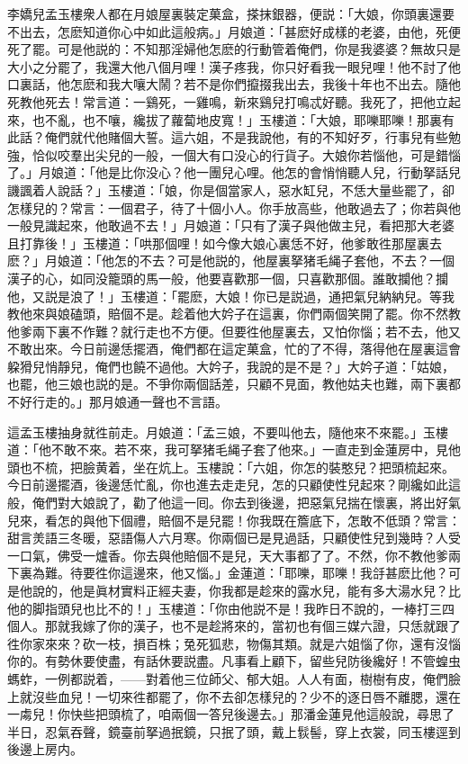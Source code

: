 李嬌兒孟玉樓衆人都在月娘屋裏裝定菓盒，搽抹銀器，便説：「大娘，你頭裏還要不出去，怎麽知道你心中如此這般病。」月娘道：「甚麽好成樣的老婆，由他，死便死了罷。可是他説的：不知那淫婦他怎麽的行動管着俺們，你是我婆婆？無故只是大小之分罷了，我還大他八個月哩！漢子疼我，你只好看我一眼兒哩！他不討了他口裏話，他怎麽和我大嚷大鬧？若不是你們攛掇我出去，我後十年也不出去。隨他死教他死去！常言道：一鷄死，一雞鳴，新來鷄兒打鳴忒好聽。我死了，把他立起來，也不亂，也不嚷，纔拔了蘿蔔地皮寬！」玉樓道：「大娘，耶嚛耶嚛！那裏有此話？俺們就代他賭個大誓。這六姐，不是我說他，有的不知好歹，行事兒有些勉強，恰似咬羣出尖兒的一般，一個大有口没心的行貨子。大娘你若惱他，可是錯惱了。」月娘道：「他是比你没心？他一團兒心哩。他怎的會悄悄聽人兒，行動拏話兒譏諷着人說話？」玉樓道：「娘，你是個當家人，惡水缸兒，不恁大量些罷了，卻怎樣兒的？常言：一個君子，待了十個小人。你手放高些，他敢過去了；你若與他一般見識起來，他敢過不去！」月娘道：「只有了漢子與他做主兒，看把那大老婆且打靠後！」玉樓道：「哄那個哩！如今像大娘心裏恁不好，他爹敢徃那屋裏去麽？」月娘道：「他怎的不去？可是他説的，他屋裏拏猪毛䋲子套他，不去？一個漢子的心，如同没籠頭的馬一般，他要喜歡那一個，只喜歡那個。誰敢攔他？攔他，又説是浪了！」玉樓道：「罷麽，大娘！你已是説過，通把氣兒納納兒。等我教他來與娘磕頭，賠個不是。趁着他大妗子在這裏，你們兩個笑開了罷。你不然教他爹兩下裏不作難？就行走也不方便。但要徃他屋裏去，又怕你惱；若不去，他又不敢出來。今日前邊恁擺酒，俺們都在這定菓盒，忙的了不得，落得他在屋裏這會躱猾兒悄靜兒，俺們也饒不過他。大妗子，我說的是不是？」大妗子道：「姑娘，也罷，他三娘也説的是。不爭你兩個話差，只顧不見面，教他姑夫也難，兩下裏都不好行走的。」那月娘通一聲也不言語。

這孟玉樓抽身就徃前走。月娘道：「孟三娘，不要叫他去，隨他來不來罷。」玉樓道：「他不敢不來。若不來，我可拏猪毛䋲子套了他來。」一直走到金蓮房中，見他頭也不梳，把臉黄着，坐在炕上。玉樓說：「六姐，你怎的裝憨兒？把頭梳起來。今日前邊擺酒，後邊恁忙亂，你也進去走走兒，怎的只顧使性兒起來？剛纔如此這般，俺們對大娘說了，勸了他這一囘。你去到後邊，把惡氣兒揣在懷裏，將出好氣兒來，看怎的與他下個禮，賠個不是兒罷！你我既在簷底下，怎敢不低頭？常言：甜言羙語三冬暖，惡語傷人六月寒。你兩個已是見過話，只顧使性兒到幾時？人受一口氣，佛受一爐香。你去與他賠個不是兒，天大事都了了。不然，你不教他爹兩下裏為難。待要徃你這邊來，他又惱。」金蓮道：「耶嚛，耶嚛！我㧱甚麽比他？可是他說的，他是眞材實料正經夫妻，你我都是趁來的露水兒，能有多大湯水兒？比他的脚指頭兒也比不的！」玉樓道：「你由他説不是！我昨日不說的，一棒打三四個人。那就我嫁了你的漢子，也不是趁將來的，當初也有個三媒六證，只恁就跟了徃你家來來？砍一枝，損百株；兔死狐悲，物傷其類。就是六姐惱了你，還有沒惱你的。有勢休要使盡，有話休要説盡。凡事看上顧下，留些兒防後纔好！不管蝗虫螞蚱，一例都説着，——對着他三位師父、郁大姐。人人有面，樹樹有皮，俺們臉上就沒些血兒！一切來徃都罷了，你不去卻怎樣兒的？少不的逐日唇不離腮，還在一䖏兒！你快些把頭梳了，咱兩個一答兒後邊去。」那潘金蓮見他這般說，尋思了半日，忍氣吞聲，鏡臺前拏過抿鏡，只抿了頭，戴上䯼髻，穿上衣裳，同玉樓逕到後邊上房内。

